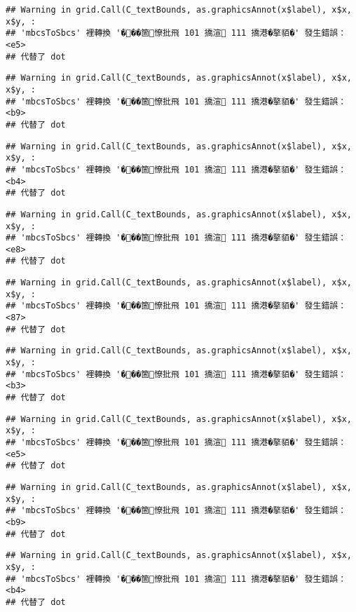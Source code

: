 \documentclass[
]{article}
\begin{document}
\begin{verbatim}
## Warning in grid.Call(C_textBounds, as.graphicsAnnot(x$label), x$x, x$y, :
## 'mbcsToSbcs' 裡轉換 '���箇憭批飛 101 撟渲 111 撟港�摮貊�' 發生錯誤：<e5>
## 代替了 dot
\end{verbatim}

\begin{verbatim}
## Warning in grid.Call(C_textBounds, as.graphicsAnnot(x$label), x$x, x$y, :
## 'mbcsToSbcs' 裡轉換 '���箇憭批飛 101 撟渲 111 撟港�摮貊�' 發生錯誤：<b9>
## 代替了 dot
\end{verbatim}

\begin{verbatim}
## Warning in grid.Call(C_textBounds, as.graphicsAnnot(x$label), x$x, x$y, :
## 'mbcsToSbcs' 裡轉換 '���箇憭批飛 101 撟渲 111 撟港�摮貊�' 發生錯誤：<b4>
## 代替了 dot
\end{verbatim}

\begin{verbatim}
## Warning in grid.Call(C_textBounds, as.graphicsAnnot(x$label), x$x, x$y, :
## 'mbcsToSbcs' 裡轉換 '���箇憭批飛 101 撟渲 111 撟港�摮貊�' 發生錯誤：<e8>
## 代替了 dot
\end{verbatim}

\begin{verbatim}
## Warning in grid.Call(C_textBounds, as.graphicsAnnot(x$label), x$x, x$y, :
## 'mbcsToSbcs' 裡轉換 '���箇憭批飛 101 撟渲 111 撟港�摮貊�' 發生錯誤：<87>
## 代替了 dot
\end{verbatim}

\begin{verbatim}
## Warning in grid.Call(C_textBounds, as.graphicsAnnot(x$label), x$x, x$y, :
## 'mbcsToSbcs' 裡轉換 '���箇憭批飛 101 撟渲 111 撟港�摮貊�' 發生錯誤：<b3>
## 代替了 dot
\end{verbatim}

\begin{verbatim}
## Warning in grid.Call(C_textBounds, as.graphicsAnnot(x$label), x$x, x$y, :
## 'mbcsToSbcs' 裡轉換 '���箇憭批飛 101 撟渲 111 撟港�摮貊�' 發生錯誤：<e5>
## 代替了 dot
\end{verbatim}

\begin{verbatim}
## Warning in grid.Call(C_textBounds, as.graphicsAnnot(x$label), x$x, x$y, :
## 'mbcsToSbcs' 裡轉換 '���箇憭批飛 101 撟渲 111 撟港�摮貊�' 發生錯誤：<b9>
## 代替了 dot
\end{verbatim}

\begin{verbatim}
## Warning in grid.Call(C_textBounds, as.graphicsAnnot(x$label), x$x, x$y, :
## 'mbcsToSbcs' 裡轉換 '���箇憭批飛 101 撟渲 111 撟港�摮貊�' 發生錯誤：<b4>
## 代替了 dot
\end{verbatim}
\end{document}
